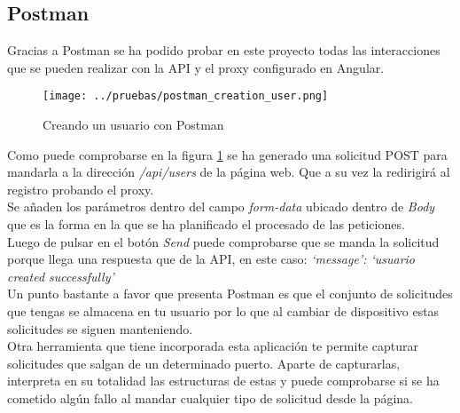 \subsection{Postman}
Gracias a Postman \cite{postman-testing} se ha podido probar en este proyecto todas las interacciones que se pueden realizar con la API y el proxy configurado en Angular.
\begin{figure}[ht]
    \centering
    \texttt{[image: ../pruebas/postman\_creation\_user.png]}
    \caption{Creando un usuario con Postman}\label{fig:postman-creation-user}
\end{figure}
Como puede comprobarse en la figura \ref{fig:postman-creation-user} se ha generado una solicitud POST para mandarla a la dirección \textit{/api/users} de la página web. Que a su vez la redirigirá al registro probando el proxy.
\\Se añaden los parámetros dentro del campo \textit{form-data} ubicado dentro de \textit{Body} que es la forma en la que se ha planificado el procesado de las peticiones.
\\Luego de pulsar en el botón \textit{Send} puede comprobarse que se manda la solicitud porque llega una respuesta que de la API, en este caso: \textit{`message': `usuario created successfully'}
\\Un punto bastante a favor que presenta Postman es que el conjunto de solicitudes que tengas se almacena en tu usuario por lo que al cambiar de dispositivo estas solicitudes se siguen manteniendo.
\\Otra herramienta que tiene incorporada esta aplicación te permite capturar solicitudes que salgan de un determinado puerto. Aparte de capturarlas, interpreta en su totalidad las estructuras de estas y puede comprobarse si se ha cometido algún fallo al mandar cualquier tipo de solicitud desde la página.

